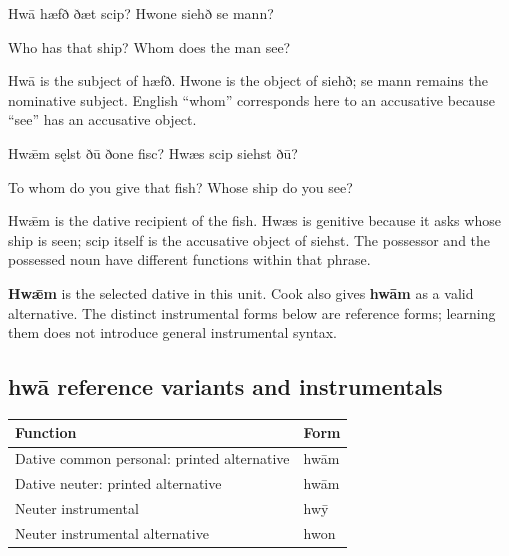 Hwā hæfð ðæt scip? Hwone siehð se mann?

Who has that ship? Whom does the man see?

Hwā is the subject of hæfð. Hwone is the object of siehð; se mann remains the nominative subject. English “whom” corresponds here to an accusative because “see” has an accusative object.

Hwǣm sęlst ðū ðone fisc? Hwæs scip siehst ðū?

To whom do you give that fish? Whose ship do you see?

Hwǣm is the dative recipient of the fish. Hwæs is genitive because it asks whose ship is seen; scip itself is the accusative object of siehst. The possessor and the possessed noun have different functions within that phrase.

\textbf{Hwǣm} is the selected dative in this unit. Cook also gives \textbf{hwām} as a valid alternative. The distinct instrumental forms below are reference forms; learning them does not introduce general instrumental syntax.

\subsection*{hwā reference variants and instrumentals}

\par\begingroup
\fontsize{10.5}{13.2}\selectfont
\setlength{\LTleft}{0pt}\setlength{\LTright}{\fill}
\noindent
\begin{tabular}{@{}>{\raggedright\arraybackslash}p{87.48mm}>{\raggedright\arraybackslash}p{33.71mm}@{}}
\toprule
\textbf{Function} & \textbf{Form} \\
\midrule
Dative common personal: printed alternative & hwām \\
Dative neuter: printed alternative & hwām \\
Neuter instrumental & hwȳ \\
Neuter instrumental alternative & hwon \\
\bottomrule
\end{tabular}
\par\endgroup


